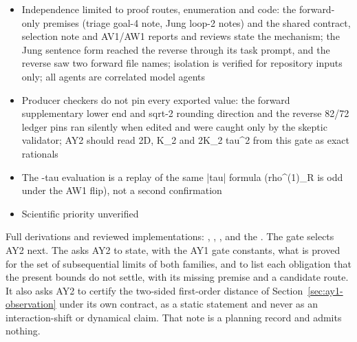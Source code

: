 \begin{gatequote}
\begin{itemize}
exclusion and cutoff passage (applied to F2 through their hypotheses); AV1
product split and cutoff-vector removal; AQ1 compactness, diagonal extraction
and Nachtergaele-Sims dynamics (named only); AW1 c\textasciicircum{}(1) and
outside-excitation lemma; the I1 dictionary; Peter-Weyl/Haar orthogonality,
Uhlmann/Fuchs-van de Graaf and Nachtergaele-Sims cited, not machine-checked
\item Independence limited to proof routes, enumeration and code: the forward-only
premises (triage goal-4 note, Jung loop-2 notes) and the shared contract,
selection note and AV1/AW1 reports and reviews state the mechanism; the Jung
sentence form reached the reverse through its task prompt, and the reverse saw
two forward file names; isolation is verified for repository inputs only; all
agents are correlated model agents
\item Producer checkers do not pin every exported value: the forward supplementary
lower end and sqrt-2 rounding direction and the reverse 82/72 ledger pins ran
silently when edited and were caught only by the skeptic validator; AY2 should
read 2D, K\_2\textquotesingle{} and 2K\_2\textquotesingle{}
tau\textasciicircum{}2 from this gate as exact rationals
\item The -tau evaluation is a replay of the same |tau| formula
(rho\textasciicircum{}(1)\_R is odd under the AW1 flip), not a second
confirmation
\item Scientific priority unverified
\end{itemize}
\end{gatequote}
Full derivations and reviewed implementations:
,
,
,
 and the
. The gate selects
AY2 next. The  asks AY2 to state, with the AY1 gate constants, what is proved for the
set of subsequential limits of both families, and to list each obligation
that the present bounds do not settle, with its missing premise and a
candidate route. It also asks AY2 to certify the two-sided first-order
distance of Section~\ref{sec:ay1-observation} under its own contract, as a
static statement and never as an interaction-shift or dynamical claim. That
note is a planning record and admits nothing.

